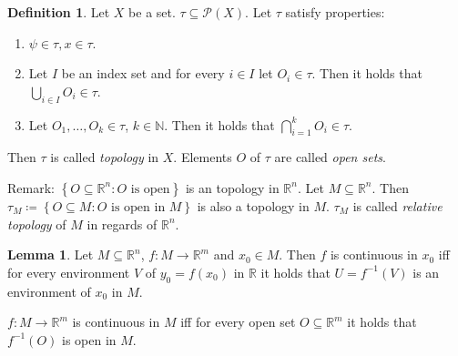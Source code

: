 \documentclass[a4paper,landscape,twocolumn]{article}
\theoremstyle{definition}
\newtheorem{defi}{Definition}
\newtheorem{lemma}{Lemma}
\newcommand\set[1]{\left\{#1\right\}}
\begin{document}
\begin{defi}
  Let $X$ be a set. $\tau \subseteq \mathcal{P}(X)$.
  Let $\tau$ satisfy properties:
  \begin{enumerate}
  \item $\psi \in \tau, x \in \tau$.
  \item Let $I$ be an index set and for every $i \in I$ let $O_i \in \tau$.
    Then it holds that $\bigcup_{i\in I} O_i \in \tau$.
  \item Let $O_1, \ldots, O_k \in \tau$, $k \in \mathbb N$.
    Then it holds that $\bigcap_{i=1}^k O_i \in \tau$.
  \end{enumerate}

  Then $\tau$ is called \emph{topology} in $X$. Elements $O$ of $\tau$ are called \emph{open sets}.

  Remark: $\set{O \subseteq \mathbb R^n: O \text{ is open}}$ is an topology in $\mathbb R^n$.
  Let $M \subseteq \mathbb R^n$. Then $\tau_M \coloneqq \set{O \subseteq M: O \text{ is open in } M}$
  is also a topology in $M$. $\tau_M$ is called \emph{relative topology} of $M$ in regards of $\mathbb R^n$.
\end{defi}

\begin{lemma}
  Let $M \subseteq \mathbb R^n$, $f: M \to \mathbb R^m$ and $x_0 \in M$.
  Then $f$ is continuous in $x_0$ iff for every environment $V$ of $y_0 = f(x_0)$ in $\mathbb R$
  it holds that $U = f^{-1}(V)$ is an environment of $x_0$ in $M$.

  $f: M \to \mathbb R^m$ is continuous in $M$ iff for every open set $O \subseteq \mathbb R^m$
  it holds that $f^{-1}(O)$ is open in $M$.
\end{lemma}
\end{document}
